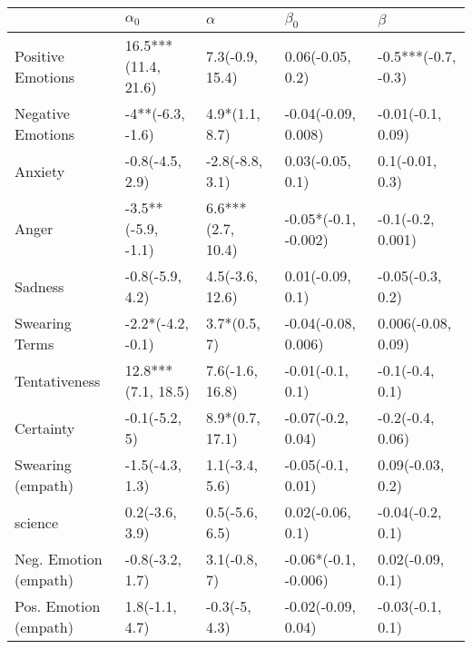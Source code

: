 \begin{tabular}{lllll}
\toprule
{} &           $\alpha_0$ &           $\alpha$ &             $\beta_0$ &              $\beta$ \\
\midrule
Positive Emotions     &  16.5***(11.4, 21.6) &    7.3(-0.9, 15.4) &      0.06(-0.05, 0.2) &  -0.5***(-0.7, -0.3) \\
Negative Emotions     &     -4**(-6.3, -1.6) &     4.9*(1.1, 8.7) &   -0.04(-0.09, 0.008) &    -0.01(-0.1, 0.09) \\
Anxiety               &      -0.8(-4.5, 2.9) &    -2.8(-8.8, 3.1) &      0.03(-0.05, 0.1) &      0.1(-0.01, 0.3) \\
Anger                 &   -3.5**(-5.9, -1.1) &  6.6***(2.7, 10.4) &  -0.05*(-0.1, -0.002) &    -0.1(-0.2, 0.001) \\
Sadness               &      -0.8(-5.9, 4.2) &    4.5(-3.6, 12.6) &      0.01(-0.09, 0.1) &     -0.05(-0.3, 0.2) \\
Swearing Terms        &    -2.2*(-4.2, -0.1) &       3.7*(0.5, 7) &   -0.04(-0.08, 0.006) &   0.006(-0.08, 0.09) \\
Tentativeness         &   12.8***(7.1, 18.5) &    7.6(-1.6, 16.8) &      -0.01(-0.1, 0.1) &      -0.1(-0.4, 0.1) \\
Certainty             &        -0.1(-5.2, 5) &    8.9*(0.7, 17.1) &     -0.07(-0.2, 0.04) &     -0.2(-0.4, 0.06) \\
Swearing (empath)     &      -1.5(-4.3, 1.3) &     1.1(-3.4, 5.6) &     -0.05(-0.1, 0.01) &     0.09(-0.03, 0.2) \\
science               &       0.2(-3.6, 3.9) &     0.5(-5.6, 6.5) &      0.02(-0.06, 0.1) &     -0.04(-0.2, 0.1) \\
Neg. Emotion (empath) &      -0.8(-3.2, 1.7) &       3.1(-0.8, 7) &  -0.06*(-0.1, -0.006) &     0.02(-0.09, 0.1) \\
Pos. Emotion (empath) &       1.8(-1.1, 4.7) &      -0.3(-5, 4.3) &    -0.02(-0.09, 0.04) &     -0.03(-0.1, 0.1) \\
\bottomrule
\end{tabular}
